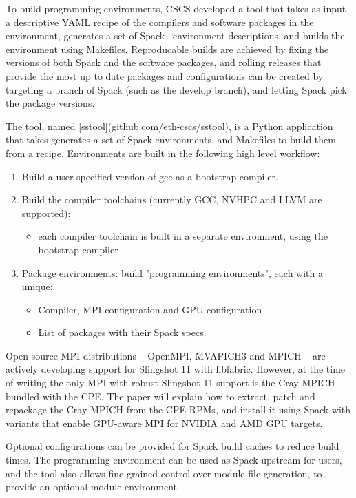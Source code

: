 To build programming environments, CSCS developed a tool that takes as input a descriptive YAML recipe of the compilers and software packages in the environment, generates a set of Spack~\cite{gamblin:sc15} environment descriptions, and builds the environment using Makefiles.
Reproducable builds are achieved by fixing the versions of both Spack and the software packages, and rolling releases that provide the most up to date packages and configurations can be created by targeting a branch of Spack (such as the develop branch), and letting Spack pick the package versions.

The tool, named [sstool](github.com/eth-cscs/sstool), is a Python application that takes generates a set of Spack environments, and Makefiles to build them from a recipe.
Environments are built in the following high level workflow:
\begin{enumerate}
    \item Build a user-specified version of gcc as a bootstrap compiler.
    \item Build the compiler toolchains (currently GCC, NVHPC and LLVM are supported):
    \begin{itemize}
        \item each compiler toolchain is built in a separate environment, using the bootstrap compiler
    \end{itemize}
    \item Package environments: build "programming environments", each with a unique:
    \begin{itemize}
        \item Compiler, MPI configuration and GPU configuration
        \item List of packages with their Spack specs.
    \end{itemize}
\end{enumerate}

Open source MPI distributions -- OpenMPI, MVAPICH3 and MPICH -- are actively developing support for Slingshot 11 with libfabric.
However, at the time of writing the only MPI with robust Slingshot 11 support is the Cray-MPICH bundled with the CPE.
The paper will explain how to extract, patch and repackage the Cray-MPICH from the CPE RPMs, and install it using Spack with variants that enable GPU-aware MPI for NVIDIA and AMD GPU targets.

Optional configurations can be provided for Spack build caches to reduce build times.
The programming environment can be used as Spack upstream for users, and the tool also allows fine-grained control over module file generation, to provide an optional module environment.
